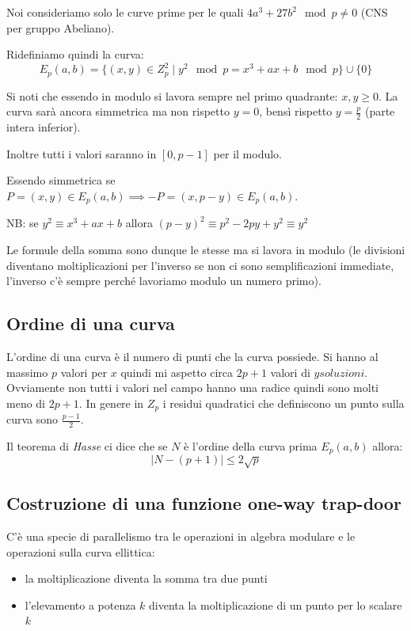 Noi consideriamo solo le curve prime per le quali $4a^3 + 27b^2 \mod p \neq 0$ (CNS per gruppo Abeliano).

Ridefiniamo quindi la curva:
$$ E_p(a,b) = \{ (x,y) \in Z_p^2 \mid y^2 \mod p = x^3 + ax + b \mod p \} \cup \{0\} $$

Si noti che essendo in modulo si lavora sempre nel primo quadrante: $x, y \geq 0$.
La curva sarà ancora simmetrica ma non rispetto $y = 0$, bensì rispetto $y = \frac{p}{2}$ (parte intera inferior).

Inoltre tutti i valori saranno in $[0, p-1]$ per il modulo.

Essendo simmetrica se $P=(x,y) \in E_p(a,b) \implies -P = (x, p-y) \in E_p(a, b)$.

NB: se $y^2 \equiv x^3 + ax + b$ allora $(p-y)^2 \equiv p^2 -2py + y^2 \equiv y^2$

Le formule della somma sono dunque le stesse ma si lavora in modulo (le divisioni diventano moltiplicazioni per l'inverso se non ci sono semplificazioni immediate, l'inverso c'è sempre perché lavoriamo modulo un numero primo).

\subsection{Ordine di una curva}
L'ordine di una curva è il numero di punti che la curva possiede.
Si hanno al massimo $p$ valori per $x$ quindi mi aspetto circa $2p + 1$ valori di $y soluzioni$.
Ovviamente non tutti i valori nel campo hanno una radice quindi sono molti meno di $2p + 1$.
In genere in $Z_p$ i residui quadratici che definiscono un punto sulla curva sono $\frac{p-1}{2}$.

Il teorema di \emph{Hasse} ci dice che se $N$ è l'ordine della curva prima $E_p(a,b)$ allora:
$$ \mid N - (p+1) \mid \leq 2\sqrt{p}  $$

\subsection{Costruzione di una funzione one-way trap-door}
C'è una specie di parallelismo tra le operazioni in algebra modulare e le operazioni sulla curva ellittica:
\begin{itemize}
    \item la moltiplicazione diventa la somma tra due punti
    \item l'elevamento a potenza $k$ diventa la moltiplicazione di un punto per lo scalare $k$
\end{itemize}

